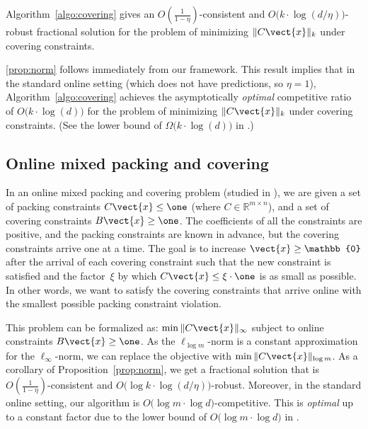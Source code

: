 \begin{proposition}	\label{prop:norm}
Algorithm~\ref{algo:covering} gives an
$O(\frac{1}{1 - \eta})$-consistent and $O\bigl( k \cdot \log (d/\eta)\bigr)$-robust fractional solution
for the problem of minimizing $\|C \vect{x}\|_{k}$ under covering constraints.
\end{proposition}

\cref{prop:norm} follows immediately from our framework.
This result implies that in the standard online setting (which does not have predictions, so $\eta = 1$), Algorithm~\ref{algo:covering}
achieves the asymptotically \emph{optimal} competitive ratio of  $O\bigl( k \cdot \log (d)\bigr)$
for the problem of minimizing $\|C \vect{x}\|_{k}$ under covering constraints. (See the lower bound
of $\Omega\bigl( k \cdot \log (d)\bigr)$ in \cite{AzarCohen14:Online-Covering}.)

\subsection{Online mixed packing and covering}
In an online mixed packing and covering problem (studied in \cite{AzarBhaskar13:Online-mixed}),
we are given a set of packing constraints $C \vect{x} \leq \one$ (where $C \in \mathbb{R}^{m \times n}$),
and a set of covering constraints $B \vect{x} \geq \one$. The coefficients of all the constraints are positive,
and the packing constraints are known in advance, but the covering constraints arrive one at a time.
The goal is to increase $\vect{x} \geq \mathbb{0}$ after the arrival of each covering constraint
such that the new constraint is satisfied and the factor~$\xi$ by which $C \vect{x} \leq \xi \cdot \one$ is as small as possible. In other words, we want to satisfy the covering constraints that arrive online with the smallest possible packing constraint violation.

This problem can be formalized as: $\min \| C \vect{x}\|_{\infty}$ subject to online constraints $B \vect{x} \geq \one$.
As the $\ell_{\log m}$-norm is a constant approximation for the $\ell_{\infty}$-norm, we can replace the objective with $\min \| C \vect{x}\|_{\log m}$.
As a corollary of Proposition~\ref{prop:norm}, we get a fractional solution that is
$O(\frac{1}{1 - \eta})$-consistent and $O\bigl( \log k \cdot \log (d/\eta)\bigr)$-robust.
Moreover, in the standard online setting, our algorithm is $O\bigl( \log m \cdot \log d \bigr)$-competitive. This is \emph{optimal} up to a constant factor
due to the lower bound of $O\bigl( \log m \cdot \log d \bigr)$ in \cite{AzarBhaskar13:Online-mixed}.
